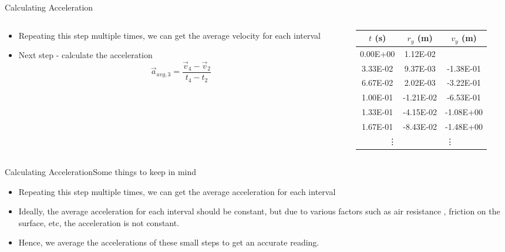 \begin{frame}{Calculating Acceleration}
\begin{columns}
\begin{column}{0.4\textwidth}
    \begin{autotext}
    \begin{itemize}
    \item Repeating this step multiple times, we can get the average
        velocity for each interval
    \item Next step - calculate the acceleration
        \[\vec{a}_{avg,3} = \frac{\vec{v}_4-\vec{v}_2}
				{t_4-t_2}\]
    \end{itemize}
    \end{autotext}
\end{column}
\begin{column}{0.6\textwidth}
	\begin{center}
    \small
    \begin{tabular}{|c|c|c|}
    \hline
    \(t\) (s) & \(r_y\) (m) & \(v_y\) (m) \\
    \hline
    0.00E+00 & 1.12E-02 &  \\
    \hline
    3.33E-02 & 9.37E-03 & -1.38E-01 \\
    \hline
    6.67E-02 & 2.02E-03 & -3.22E-01 \\
    \hline
    1.00E-01 & -1.21E-02 & -6.53E-01 \\
    \hline
    1.33E-01 & -4.15E-02 & -1.08E+00 \\
    \hline
    1.67E-01 & -8.43E-02 & -1.48E+00 \\
    \hline
	\multicolumn{3}{|c|}{\vdots\ \ \ \ \ \ \ \ \ \ \ \ \vdots} \\
	\hline
   \end{tabular}
   \end{center}
\end{column}
\end{columns}
\end{frame}

\begin{frame}{Calculating Acceleration}{Some things to keep in mind}
    \begin{itemize}
	\item Repeating this step multiple times, we can get the average
		acceleration for each interval
	\item Ideally, the average acceleration for each interval should be 
		constant, but due to various factors such as air resistance
		, friction on the surface, etc, the acceleration is not constant. 
	\item Hence, we average the accelerations of these small steps to get an 
	accurate reading.
	\end{itemize}
\end{frame}